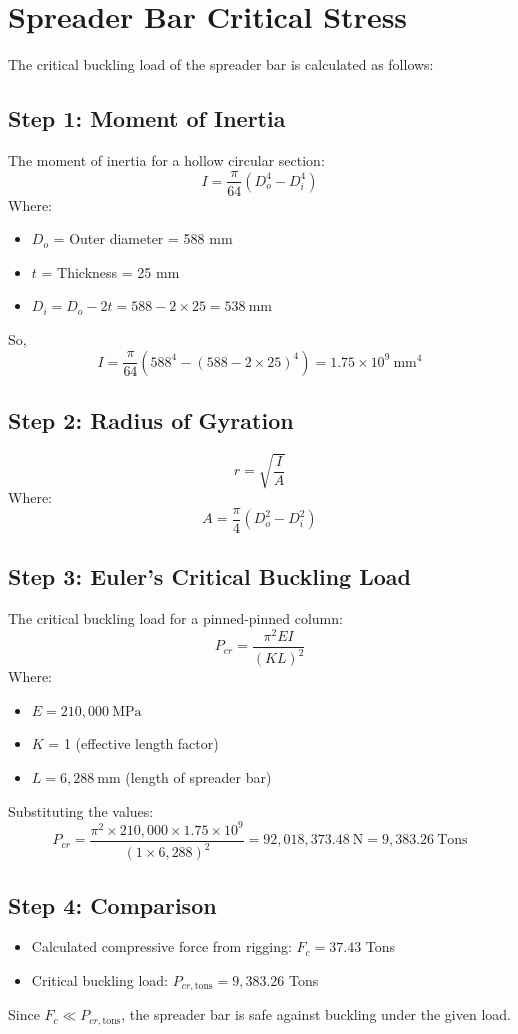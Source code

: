 \documentclass[12pt]{article}
\begin{document}
\section{Spreader Bar Critical Stress}
The critical buckling load of the spreader bar is calculated as follows:

\subsection*{Step 1: Moment of Inertia}
The moment of inertia for a hollow circular section:
\[
I = \frac{\pi}{64} (D_o^4 - D_i^4)
\]
Where:
\begin{itemize}
  \item $D_o$ = Outer diameter = 588 mm
  \item $t$ = Thickness = 25 mm
  \item $D_i = D_o - 2t = 588 - 2 \times 25 = 538\ \mathrm{mm}$
\end{itemize}
So,
\[
I = \frac{\pi}{64} (588^4 - (588-2 \times 25)^4) = 1.75 \times 10^9\ \mathrm{mm}^4
\]

\subsection*{Step 2: Radius of Gyration}
\[
r = \sqrt{\frac{I}{A}}
\]
Where:
\[
A = \frac{\pi}{4} (D_o^2 - D_i^2)
\]

\subsection*{Step 3: Euler's Critical Buckling Load}
The critical buckling load for a pinned-pinned column:
\[
P_{cr} = \frac{\pi^2 E I}{(K L)^2}
\]
Where:
\begin{itemize}
  \item $E = 210,000\ \mathrm{MPa}$
  \item $K$ = 1 (effective length factor)
  \item $L = 6,288\ \mathrm{mm}$ (length of spreader bar)
\end{itemize}
Substituting the values:
\[
P_{cr} = \frac{\pi^2 \times 210,000 \times 1.75 \times 10^9}{(1 \times 6,288)^2} = 92,018,373.48\ \mathrm{N} = 9,383.26\ \text{Tons}
\]

\subsection*{Step 4: Comparison}
\begin{itemize}
  \item Calculated compressive force from rigging: $F_c = 37.43$ Tons
  \item Critical buckling load: $P_{cr,\text{tons}} = 9,383.26$ Tons
\end{itemize}
Since $F_c \ll P_{cr,\text{tons}}$, the spreader bar is safe against buckling under the given load.
\end{document}
